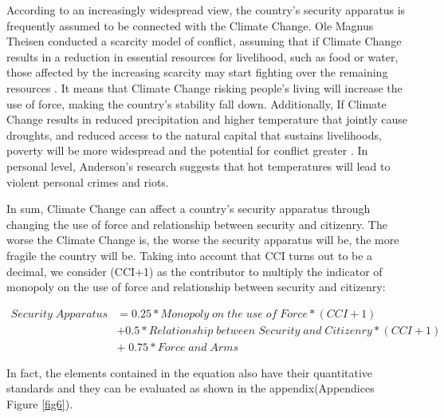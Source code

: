 \documentclass[a4paper,12pt]{article}
\begin{document}
 According to an increasingly widespread view, the country's security apparatus is frequently assumed to be connected with the Climate Change. Ole Magnus Theisen conducted a scarcity model of conflict, assuming that if Climate Change results in a reduction in essential resources for livelihood, such as food or water, those affected by the increasing scarcity may start fighting over the remaining resources \citep{Theisen2013Is}. It means that Climate Change risking people's living will increase the use of force, making the country's stability fall down. Additionally, If Climate Change results in reduced precipitation and higher temperature that jointly cause droughts, and reduced access to the natural capital that sustains livelihoods, poverty will be more widespread and the potential for conflict greater \citep{Gleditsch2014Whither}. In personal level, Anderson's research \citep{Anderson2001Heat} suggests that hot temperatures will lead to violent personal crimes and riots. 
 
 In sum, Climate Change can affect a country's security apparatus through changing the use of force and relationship between security and citizenry. The worse the Climate Change is, the worse the security apparatus will be, the more fragile the country will be. Taking into account that CCI turns out to be a decimal, we consider (CCI+1) as the contributor to multiply the indicator of monopoly on the use of force and relationship between security and citizenry:

\begin{equation}
\label{eq9}
\begin{split}
Security\;Apparatus&=0.25*Monopoly\;on\;the\;use\;of\;Force*(CCI+1)\\&+0.5*Relationship\;between\;Security\;and\;Citizenry*(CCI+1)\\ &+\;0.75*Force\;and\;Arms
\end{split}
\end{equation}

In fact, the elements contained in the equation also have their quantitative standards and they can be evaluated as shown in the appendix(Appendices Figure \ref{fig6}).
\end{document}

